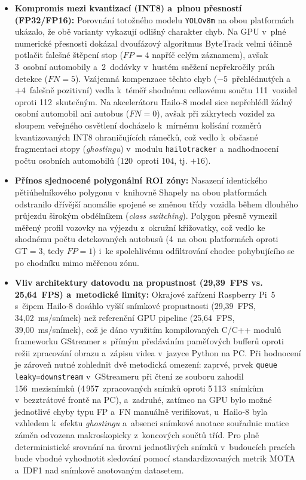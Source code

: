 \begin{itemize}
    \item \textbf{Kompromis mezi kvantizací (INT8) a~plnou přesností (FP32/FP16):} Porovnání totožného modelu \texttt{YOLOv8m} na obou platformách ukázalo, že obě varianty vykazují odlišný charakter chyb. Na GPU v~plné numerické přesnosti dokázal dvoufázový algoritmus ByteTrack velmi účinně potlačit falešné štěpení stop ($FP = 4$ napříč celým záznamem), avšak 3~osobní automobily a~2~dodávky v~hustém sněžení nepřekročily práh detekce ($FN = 5$). Vzájemná kompenzace těchto chyb ($-5$~přehlédnutých a~$+4$~falešně pozitivní) vedla k~téměř shodnému celkovému součtu 111~vozidel oproti 112~skutečným. Na akcelerátoru Hailo-8 model sice nepřehlédl žádný osobní automobil ani autobus ($FN = 0$), avšak při zákrytech vozidel za sloupem veřejného osvětlení docházelo k~mírnému kolísání rozměrů kvantizovaných INT8 ohraničujících rámečků, což vedlo k~občasné fragmentaci stopy (\textit{ghostingu}) v~modulu \texttt{hailotracker} a~nadhodnocení počtu osobních automobilů (120~oproti 104, tj. $+16$).
    \item \textbf{Přínos sjednocené polygonální ROI zóny:} Nasazení identického pětiúhelníkového polygonu v~knihovně Shapely na obou platformách odstranilo dřívější anomálie spojené se změnou třídy vozidla během dlouhého průjezdu širokým obdélníkem (\textit{class switching}). Polygon přesně vymezil měřený profil vozovky na výjezdu z~okružní křižovatky, což vedlo ke shodnému počtu detekovaných autobusů (4~na obou platformách oproti $\text{GT} = 3$, tedy $FP = 1$) i~ke spolehlivému odfiltrování chodce pohybujícího se po chodníku mimo měřenou zónu.
    \item \textbf{Vliv architektury datovodu na propustnost (29,39~\acs{FPS} vs. 25,64~FPS) a~metodické limity:} Okrajové zařízení Raspberry Pi~5 s~čipem Hailo-8 dosáhlo vyšší snímkové propustnosti (29,39~FPS, 34,02~ms/snímek) než referenční GPU pipeline (25,64~FPS, 39,00~ms/snímek), což je dáno využitím kompilovaných C/C++ modulů frameworku GStreamer s~přímým předáváním paměťových bufferů oproti režii zpracování obrazu a~zápisu videa v~jazyce Python na PC. Při hodnocení je zároveň nutné zohlednit dvě metodická omezení: zaprvé, prvek \texttt{queue leaky=downstream} v~GStreameru při čtení ze souboru zahodil 156~mezisnímků (4\,957~zpracovaných snímků oproti 5\,113~snímkům v~bezztrátové frontě na PC), a~zadruhé, zatímco na GPU bylo možné jednotlivé chyby typu \acs{FP} a~\acs{FN} manuálně verifikovat, u~Hailo-8 byla vzhledem k~efektu \textit{ghostingu} a~absenci snímkové anotace souřadnic matice záměn odvozena makroskopicky z~koncových součtů tříd. Pro plně deterministické srovnání na úrovni jednotlivých snímků v~budoucích pracích bude vhodné vyhodnotit sledování pomocí standardizovaných metrik MOTA a~IDF1 nad snímkově anotovaným datasetem.
\end{itemize}

